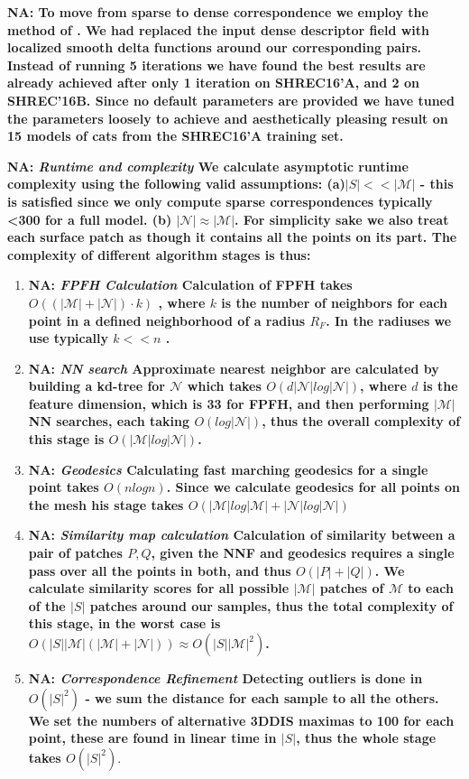 \documentclass[10pt,twocolumn,letterpaper]{article}
\newcommand{\colornote}[3]{{\color{#1}\bf{#2: #3}\normalfont}}
\newcommand{\colornote}[3]{}
\newcommand {\nadav}[1]{\colornote{red}{NA}{#1}}
\begin{document}
\nadav{
To move from sparse to dense correspondence we employ the method of \cite{litany2017fully}. 
We had replaced the input dense descriptor field with localized smooth delta functions around our corresponding pairs.
Instead of running 5 iterations we have found the best results are already achieved after only 1 iteration on SHREC16'A, and 2 on SHREC'16B. Since no default parameters are provided we have tuned the parameters loosely to achieve and aesthetically pleasing result on 15 models of cats from the SHREC16'A training set.}

\nadav{
\emph{Runtime and complexity} We calculate asymptotic runtime complexity using the following valid assumptions:
(a)$|S|<<|\mathcal{M}|$ - this is satisfied since we only compute sparse correspondences typically <300 for a full model. 
(b) $|\mathcal{N}|\approx |\mathcal{M}|$. 
For simplicity sake we also treat each surface patch as though it contains all the points on its part. 
The complexity of different algorithm stages is thus:
}
\begin{enumerate}
	
	\item \nadav{\textit{FPFH Calculation} Calculation of FPFH takes $O((|\mathcal{M}|+|\mathcal{N}|) \cdot k)$ , where $k$ is the number of neighbors for each point in a defined neighborhood of a radius $R_F$. In the radiuses we use typically $k << n$ .
	}
	
	\item \nadav{\textit{NN search} Approximate nearest neighbor are calculated by building a kd-tree for $\mathcal{N}$ which takes $O(d|\mathcal{N}|log|\mathcal{N}|)$, where $d$ is the feature dimension, which is 33 for FPFH, and then performing $|\mathcal{M}|$ NN searches, each taking $O(log|\mathcal{N}|)$, thus the overall complexity of this stage is $O(|\mathcal{M}|log|\mathcal{N}|)$.}
	
	\item \nadav{\textit{Geodesics} Calculating fast marching geodesics for a single point takes $O(nlogn)$.
	Since we calculate geodesics for all points on the mesh his stage takes $O(|\mathcal{M}|log|\mathcal{M}|+|\mathcal{N}|log|\mathcal{N}|)$}

	\item \nadav{\textit{Similarity map calculation} Calculation of similarity between a pair of patches $P,Q$, given the NNF and geodesics requires a single pass over all the points in both, and thus $O(|P|+|Q|)$. 
	We calculate similarity scores for all possible $|\mathcal{M}|$ patches of $\mathcal{M}$ to each of the $|S|$ patches around our samples, thus the total complexity of this stage, in the worst case is $O(|S||\mathcal{M}|(|\mathcal{M}|+|\mathcal{N}|))\approx O(|S||\mathcal{M}|^2)$.}

	\item \nadav{\textit{Correspondence Refinement} Detecting outliers is done in $O(|S|^2)$ - we sum the distance for each sample to all the others. We set the numbers of alternative 3DDIS maximas to 100 for each point, these are found in linear time in $|S|$, thus the whole stage takes $O(|S|^2)$}.
\end{enumerate}
\end{document}
